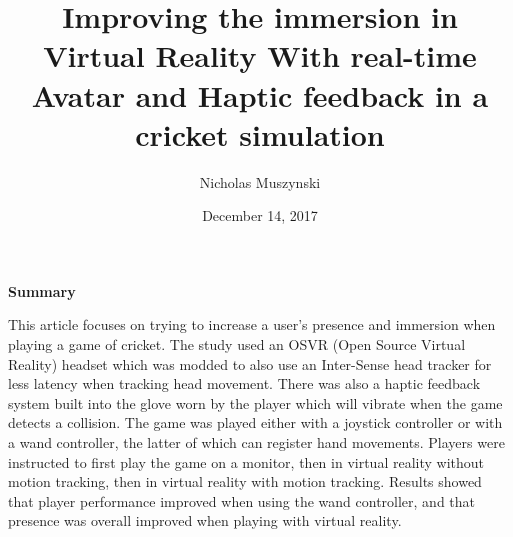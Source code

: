 \documentclass{article}
\begin{document}
\title{Improving the immersion in Virtual Reality With real-time Avatar and Haptic feedback in a cricket simulation}
\author{Nicholas Muszynski}
\date{December 14, 2017}

\maketitle

\textbf{Summary}
\newline

This article focuses on trying to increase a user's presence and immersion when playing a game of cricket. The study used an OSVR (Open Source Virtual Reality) headset which was modded to also use an Inter-Sense head tracker for less latency when tracking head movement. There was also a haptic feedback system built into the glove worn by the player which will vibrate when the game detects a collision. The game was played either with a joystick controller or with a wand controller, the latter of which can register hand movements. Players were instructed to first play the game on a monitor, then in virtual reality without motion tracking, then in virtual reality with motion tracking. Results showed that player performance improved when using the wand controller, and that presence was overall improved when playing with virtual reality.

\nocite{cricketCite}



\end{document}
